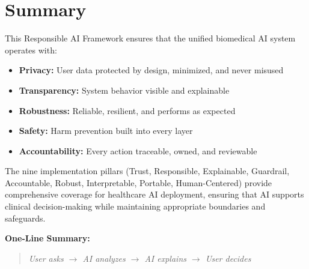 \section{Summary}

This Responsible AI Framework ensures that the unified biomedical AI system operates with:

\begin{itemize}
    \item \textbf{Privacy:} User data protected by design, minimized, and never misused
    \item \textbf{Transparency:} System behavior visible and explainable
    \item \textbf{Robustness:} Reliable, resilient, and performs as expected
    \item \textbf{Safety:} Harm prevention built into every layer
    \item \textbf{Accountability:} Every action traceable, owned, and reviewable
\end{itemize}

\noindent The nine implementation pillars (Trust, Responsible, Explainable, Guardrail, Accountable, Robust, Interpretable, Portable, Human-Centered) provide comprehensive coverage for healthcare AI deployment, ensuring that AI supports clinical decision-making while maintaining appropriate boundaries and safeguards.

\vspace{1cm}

\noindent\textbf{One-Line Summary:}
\begin{quote}
\textit{User asks $\rightarrow$ AI analyzes $\rightarrow$ AI explains $\rightarrow$ User decides}
\end{quote}


